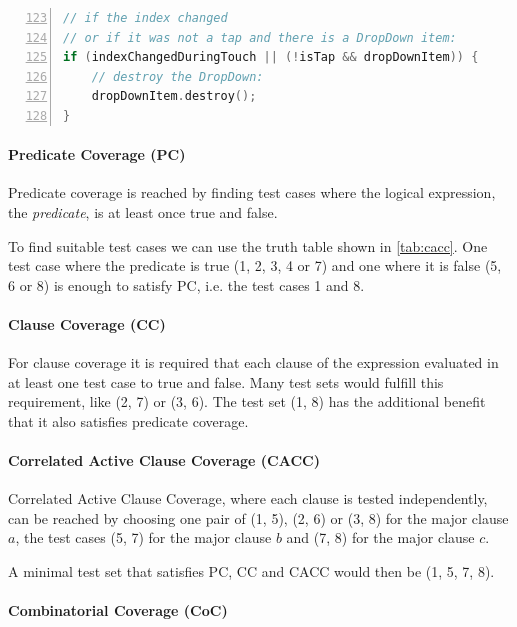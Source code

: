 \documentclass{scrreprt}
\begin{document}
\bigskip
\begin{lstlisting}[language=C++,
					numbers=left,
					firstnumber=123,
					directivestyle={\color{black}}
					emph={int,char,double,float,unsigned},
					emphstyle={\color{blue}},
					caption=qml/CustomControls/ComboBox2.qml,
					label=lst:logical_expression_code]
// if the index changed
// or if it was not a tap and there is a DropDown item:
if (indexChangedDuringTouch || (!isTap && dropDownItem)) {
	// destroy the DropDown:
	dropDownItem.destroy();
}
\end{lstlisting}
\bigskip

\paragraph{Predicate Coverage (PC)}

Predicate coverage is reached by finding test cases where the logical expression, the \textit{predicate}, is at least once true and false.

To find suitable test cases we can use the truth table shown in \vref{tab:cacc}. One test case where the predicate is true (1, 2, 3, 4 or 7) and one where it is false (5, 6 or 8) is enough to satisfy PC, i.e. the test cases 1 and 8.

\paragraph{Clause Coverage (CC)}

For clause coverage it is required that each clause of the expression evaluated in at least one test case to true and false. Many test sets would fulfill this requirement, like (2, 7) or (3, 6). The test set (1, 8) has the additional benefit that it also satisfies predicate coverage.

\paragraph{Correlated Active Clause Coverage (CACC)}

Correlated Active Clause Coverage, where each clause is tested independently, can be reached by choosing one pair of (1, 5), (2, 6) or (3, 8) for the major clause $a$, the test cases (5, 7) for the major clause $b$ and (7, 8) for the major clause $c$.

A minimal test set that satisfies PC, CC and CACC would then be (1, 5, 7, 8).

\paragraph{Combinatorial Coverage (CoC)}
\end{document}
